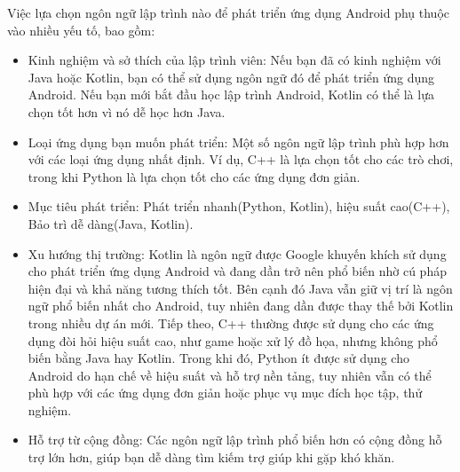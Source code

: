         Việc lựa chọn ngôn ngữ lập trình nào để phát triển ứng dụng Android phụ thuộc vào nhiều yếu tố, bao gồm:
        \setlength{\leftmargini}{1.5cm}
        \begin{itemize}
            \item Kinh nghiệm và sở thích của lập trình viên: Nếu bạn đã có kinh nghiệm với Java hoặc Kotlin, bạn có thể sử dụng ngôn ngữ đó để phát triển ứng dụng Android. Nếu bạn mới bắt đầu học lập trình Android, Kotlin có thể là lựa chọn tốt hơn vì nó dễ học hơn Java.
            \item Loại ứng dụng bạn muốn phát triển: Một số ngôn ngữ lập trình phù hợp hơn với các loại ứng dụng nhất định. Ví dụ, C++ là lựa chọn tốt cho các trò chơi, trong khi Python là lựa chọn tốt cho các ứng dụng đơn giản.
            \item Mục tiêu phát triển: Phát triển nhanh(Python, Kotlin), hiệu suất cao(C++), Bảo trì dễ dàng(Java, Kotlin).
            \item Xu hướng thị trường: Kotlin là ngôn ngữ được Google khuyến khích sử dụng cho phát triển ứng dụng Android và đang dần trở nên phổ biến nhờ cú pháp hiện đại và khả năng tương thích tốt. Bên cạnh đó Java vẫn giữ vị trí là ngôn ngữ phổ biến nhất cho Android, tuy nhiên đang dần được thay thế bởi Kotlin trong nhiều dự án mới. Tiếp theo, C++ thường được sử dụng cho các ứng dụng đòi hỏi hiệu suất cao, như game hoặc xử lý đồ họa, nhưng không phổ biến bằng Java hay Kotlin. Trong khi đó, Python ít được sử dụng cho Android do hạn chế về hiệu suất và hỗ trợ nền tảng, tuy nhiên vẫn có thể phù hợp với các ứng dụng đơn giản hoặc phục vụ mục đích học tập, thử nghiệm.        
            \item Hỗ trợ từ cộng đồng: Các ngôn ngữ lập trình phổ biến hơn có cộng đồng hỗ trợ lớn hơn, giúp bạn dễ dàng tìm kiếm trợ giúp khi gặp khó khăn.   
        \end{itemize}

